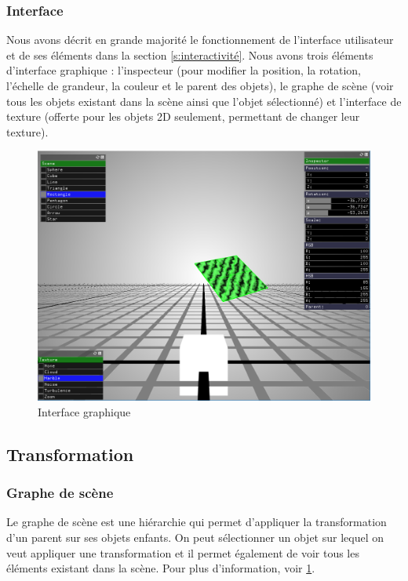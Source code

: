 \subsubsection{Interface}
Nous avons décrit en grande majorité le fonctionnement de l’interface utilisateur et de ses éléments dans la section \ref{s:interactivité}.
Nous avons trois éléments d'interface graphique : l’inspecteur (pour modifier la position, la rotation, l’échelle de grandeur, la couleur et le parent des objets), le graphe de scène (voir tous les objets existant dans la scène ainsi que l’objet sélectionné) et l’interface de texture (offerte pour les objets 2D seulement, permettant de changer leur texture).
\begin{figure}[H]
    \centering
	\includegraphics[scale=0.4]{fig/principale.PNG}
	\caption{Interface graphique}
	\label{fig:ui}
\end{figure}

\subsection{Transformation}
\subsubsection{Graphe de scène}
Le graphe de scène est une hiérarchie qui permet d’appliquer la transformation d’un parent sur ses objets enfants. On peut sélectionner un objet sur lequel on veut appliquer une transformation et il permet également de voir tous les éléments existant dans la scène. Pour plus d’information, voir \ref{fig:ui}.

